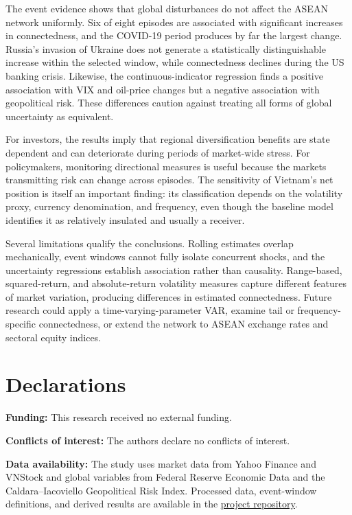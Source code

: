 \documentclass[12pt,a4paper]{article}
\begin{document}
The event evidence shows that global disturbances do not affect the ASEAN network uniformly. Six of eight episodes are associated with significant increases in connectedness, and the COVID-19 period produces by far the largest change. Russia's invasion of Ukraine does not generate a statistically distinguishable increase within the selected window, while connectedness declines during the US banking crisis. Likewise, the continuous-indicator regression finds a positive association with VIX and oil-price changes but a negative association with geopolitical risk. These differences caution against treating all forms of global uncertainty as equivalent.

For investors, the results imply that regional diversification benefits are state dependent and can deteriorate during periods of market-wide stress. For policymakers, monitoring directional measures is useful because the markets transmitting risk can change across episodes. The sensitivity of Vietnam's net position is itself an important finding: its classification depends on the volatility proxy, currency denomination, and frequency, even though the baseline model identifies it as relatively insulated and usually a receiver.

Several limitations qualify the conclusions. Rolling estimates overlap mechanically, event windows cannot fully isolate concurrent shocks, and the uncertainty regressions establish association rather than causality. Range-based, squared-return, and absolute-return volatility measures capture different features of market variation, producing differences in estimated connectedness. Future research could apply a time-varying-parameter VAR, examine tail or frequency-specific connectedness, or extend the network to ASEAN exchange rates and sectoral equity indices.

\section*{Declarations}

\textbf{Funding:} This research received no external funding.

\textbf{Conflicts of interest:} The authors declare no conflicts of interest.

\textbf{Data availability:} The study uses market data from Yahoo Finance and VNStock and global variables from Federal Reserve Economic Data and the Caldara--Iacoviello Geopolitical Risk Index. Processed data, event-window definitions, and derived results are available in the \href{https://github.com/DeckardShaw31/Time-Varying-Volatility-Connectedness-among-ASEAN-Equity-Markets}{project repository}.
\end{document}

